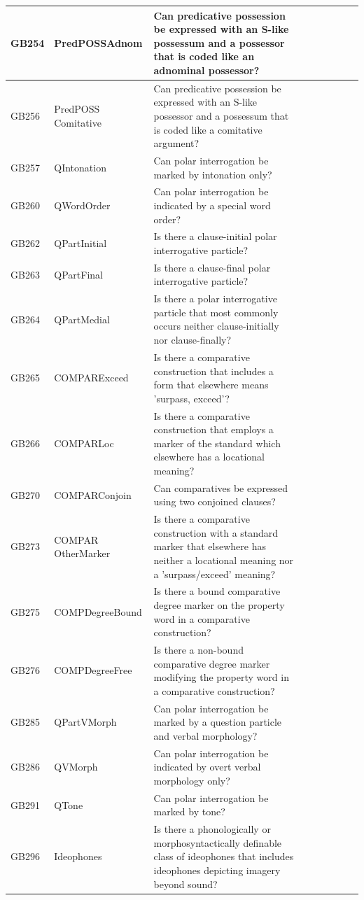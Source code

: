 \documentclass[a4paper,10pt]{article} %
\begin{document}
\begin{landscape}
\begin{longtable}{| l | p{4cm}| p{12cm}|p{2cm}|p{2cm}|p{2cm}|p{2cm}|p{2cm}|p{2cm}|}
GB254 & PredPOSSAdnom&Can predicative possession be expressed with an S-like possessum and a possessor that is coded like an adnominal possessor?\\ \hline
GB256 & PredPOSS Comitative&Can predicative possession be expressed with an S-like possessor and a possessum that is coded like a comitative argument?\\ \hline
GB257 & QIntonation&Can polar interrogation be marked by intonation only?\\ \hline
GB260 & QWordOrder&Can polar interrogation be indicated by a special word order?\\ \hline
GB262 & QPartInitial&Is there a clause-initial polar interrogative particle?\\ \hline
GB263 & QPartFinal&Is there a clause-final polar interrogative particle?\\ \hline
GB264 & QPartMedial&Is there a polar interrogative particle that most commonly occurs neither clause-initially nor clause-finally?\\ \hline
GB265 & COMPARExceed&Is there a comparative construction that includes a form that elsewhere means 'surpass, exceed'?\\ \hline
GB266 & COMPARLoc&Is there a comparative construction that employs a marker of the standard which elsewhere has a locational meaning?\\ \hline
GB270 & COMPARConjoin&Can comparatives be expressed using two conjoined clauses?\\ \hline
GB273 & COMPAR OtherMarker&Is there a comparative construction with a standard marker that elsewhere has neither a locational meaning nor a 'surpass/exceed' meaning?\\ \hline
GB275 & COMPDegreeBound&Is there a bound comparative degree marker on the property word in a comparative construction?\\ \hline
GB276 & COMPDegreeFree&Is there a non-bound comparative degree marker modifying the property word in a comparative construction?\\ \hline
GB285 & QPartVMorph&Can polar interrogation be marked by a question particle and verbal morphology?\\ \hline
GB286 & QVMorph&Can polar interrogation be indicated by overt verbal morphology only?\\ \hline
GB291 & QTone&Can polar interrogation be marked by tone?\\ \hline
GB296 & Ideophones&Is there a phonologically or morphosyntactically definable class of ideophones that includes ideophones depicting imagery beyond sound?\\ \hline

\end{longtable}
\end{landscape}
\end{document}
